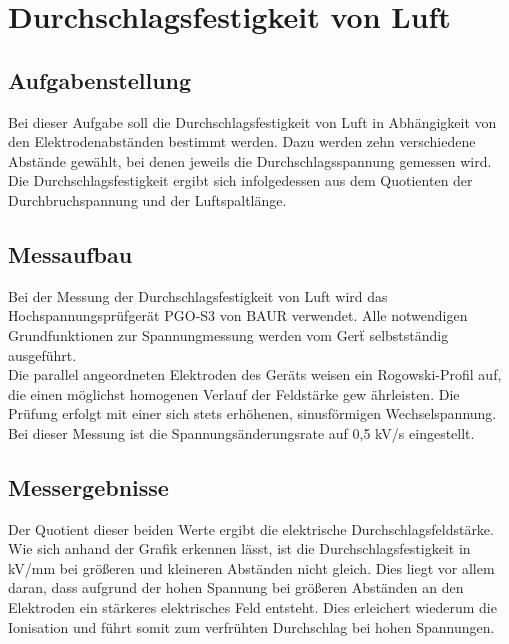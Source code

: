 \documentclass[a4paper,twoside,12pt,DIV=13,BCOR=5mm,numbers=noenddot,cleardoublepage=empty]{scrbook}
\begin{document}
	\section{Durchschlagsfestigkeit von Luft}

		\subsection{Aufgabenstellung}
			Bei dieser Aufgabe soll die Durchschlagsfestigkeit von Luft in 
            Abh\"angigkeit von den Elektrodenabst\"anden bestimmt werden. 
			Dazu werden zehn verschiedene Abst\"ande gew\"ahlt, bei denen jeweils 
			die Durchschlagsspannung gemessen wird. Die Durchschlagsfestigkeit ergibt sich infolgedessen aus dem Quotienten der Durchbruchspannung und der Luftspaltl\"ange.		\\
		\subsection{Messaufbau}
			Bei der Messung der Durchschlagsfestigkeit von Luft wird das 
			Hochspannungspr\"ufger\"at PGO-S3 von BAUR verwendet. 
			Alle notwendigen Grundfunktionen zur Spannungmessung werden vom
			Ger\"t selbstst\"andig ausgef\"uhrt. \\
			Die parallel angeordneten Elektroden des Ger\"ats weisen ein 
			Rogowski-Profil auf, die 
			einen m\"oglichst homogenen Verlauf der Feldst\"arke gew
			\"ahrleisten. 
			Die Pr\"ufung erfolgt mit einer sich stets erh\"ohenen, sinusf\"ormigen Wechselspannung. 
			Bei dieser Messung ist die Spannungs\"anderungsrate auf 0,5 kV/s eingestellt.
		\subsection{Messergebnisse}
			
		Der Quotient dieser beiden Werte ergibt die elektrische Durchschlagsfeldst\"arke.
		\\
		Wie sich anhand der Grafik erkennen l\"asst, ist die Durchschlagsfestigkeit in kV/mm bei gr\"o\ss{}eren und kleineren Abst\"anden nicht gleich. 
		Dies liegt vor allem daran, dass  aufgrund der hohen Spannung bei gr\"o\ss{}eren Abst\"anden an den Elektroden ein st\"arkeres elektrisches Feld entsteht. 
		Dies erleichert wiederum die Ionisation und f\"uhrt somit zum verfr\"uhten Durchschlag bei hohen Spannungen.
\end{document}
